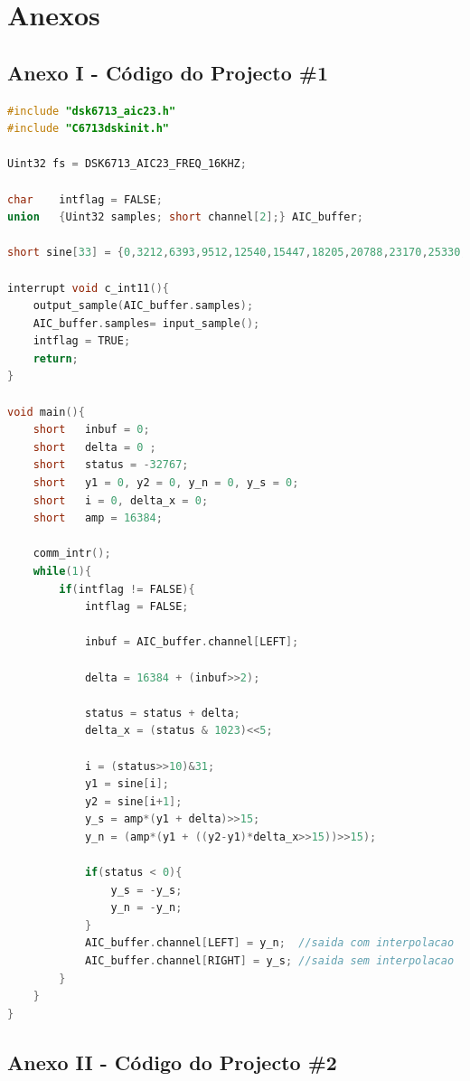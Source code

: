 \documentclass[11pt]{article}
\numberwithin{equation}{section}
\begin{document}
\section{Anexos}

\subsection{Anexo I - Código do Projecto \#1}

\begin{lstlisting}[language=C]
#include "dsk6713_aic23.h"
#include "C6713dskinit.h"

Uint32 fs = DSK6713_AIC23_FREQ_16KHZ;

char	intflag = FALSE;
union	{Uint32 samples; short channel[2];} AIC_buffer;

short sine[33] = {0,3212,6393,9512,12540,15447,18205,20788,23170,25330,27246,28899,30274,31357,		32138,32610,32767,32610,32138,31357,30274,28899,27246,25330,23170,20788,18205,	15447,12540,9512,6393,3212,0}; 

interrupt void c_int11(){                  	
	output_sample(AIC_buffer.samples); 
	AIC_buffer.samples= input_sample(); 
	intflag = TRUE;
	return;
}

void main(){
	short	inbuf = 0;
	short	delta = 0 ;
	short	status = -32767;
	short	y1 = 0, y2 = 0, y_n = 0, y_s = 0;
	short	i = 0, delta_x = 0;
	short	amp = 16384;
	
	comm_intr();
	while(1){
		if(intflag != FALSE){
			intflag = FALSE;
				
			inbuf = AIC_buffer.channel[LEFT];
			
			delta = 16384 + (inbuf>>2);
			
			status = status + delta;
			delta_x = (status & 1023)<<5;
			
			i = (status>>10)&31;
			y1 = sine[i];
			y2 = sine[i+1];
			y_s = amp*(y1 + delta)>>15;  
			y_n = (amp*(y1 + ((y2-y1)*delta_x>>15))>>15);
			
			if(status < 0){
				y_s = -y_s;
				y_n = -y_n;
			}
			AIC_buffer.channel[LEFT] = y_n;  //saida com interpolacao
			AIC_buffer.channel[RIGHT] = y_s; //saida sem interpolacao
		}
	}
}
\end{lstlisting}

\subsection{Anexo II - Código do Projecto \#2}
\end{document}
